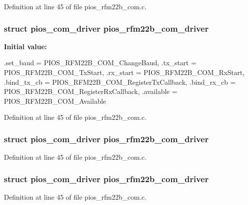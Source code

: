 \-Definition at line 45 of file pios\-\_\-rfm22b\-\_\-com.\-c.

\hypertarget{group___p_i_o_s___r_f_m22_b_gafc506e8bc70ed8b31b75cbddf28ee660}{
\subsubsection[{pios\-\_\-rfm22b\-\_\-com\-\_\-driver}]{\setlength{\rightskip}{0pt plus 5cm}struct {\bf pios\-\_\-com\-\_\-driver} {\bf pios\-\_\-rfm22b\-\_\-com\-\_\-driver}}}\label{group___p_i_o_s___r_f_m22_b_gafc506e8bc70ed8b31b75cbddf28ee660}
{\bfseries \-Initial value\-:}
\begin{DoxyCode}
 {
        .set_baud   = PIOS_RFM22B_COM_ChangeBaud,
        .tx_start   = PIOS_RFM22B_COM_TxStart,
        .rx_start   = PIOS_RFM22B_COM_RxStart,
        .bind_tx_cb = PIOS_RFM22B_COM_RegisterTxCallback,
        .bind_rx_cb = PIOS_RFM22B_COM_RegisterRxCallback,
        .available  = PIOS_RFM22B_COM_Available
}
\end{DoxyCode}


\-Definition at line 45 of file pios\-\_\-rfm22b\-\_\-com.\-c.

\hypertarget{group___p_i_o_s___r_f_m22_b_gafc506e8bc70ed8b31b75cbddf28ee660}{
\subsubsection[{pios\-\_\-rfm22b\-\_\-com\-\_\-driver}]{\setlength{\rightskip}{0pt plus 5cm}struct {\bf pios\-\_\-com\-\_\-driver} {\bf pios\-\_\-rfm22b\-\_\-com\-\_\-driver}}}\label{group___p_i_o_s___r_f_m22_b_gafc506e8bc70ed8b31b75cbddf28ee660}


\-Definition at line 45 of file pios\-\_\-rfm22b\-\_\-com.\-c.

\hypertarget{group___p_i_o_s___r_f_m22_b_gafc506e8bc70ed8b31b75cbddf28ee660}{
\subsubsection[{pios\-\_\-rfm22b\-\_\-com\-\_\-driver}]{\setlength{\rightskip}{0pt plus 5cm}struct {\bf pios\-\_\-com\-\_\-driver} {\bf pios\-\_\-rfm22b\-\_\-com\-\_\-driver}}}\label{group___p_i_o_s___r_f_m22_b_gafc506e8bc70ed8b31b75cbddf28ee660}


\-Definition at line 45 of file pios\-\_\-rfm22b\-\_\-com.\-c.

